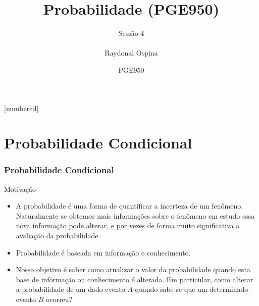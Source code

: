 


[numbered]



\hypersetup{colorlinks,linkcolor=,urlcolor=links}


\graphicspath{{./graphics/}} 			%

\newcommand{\cor}[1]{ \{{#1}\}}


\title[Probabilidade]{  Probabilidade (PGE950) }
\author[ Raydonal Ospina  
\ ]{
Sessão 4 \\
${}$ \\
Raydonal Ospina  }
\date[PGE950 - \today ]{{\tiny PGE950 }}






\begin{frame}
  \titlepage
\end{frame}


\section{Probabilidade Condicional}
\begin{frame}
\frametitle{Probabilidade Condicional}

\vspace{1cm}
\begin{block}{Motivação}
	\begin{itemize}
	
\item 	A probabilidade é uma forma de quantificar a incerteza de um fenômeno. Naturalmente se obtemos mais informações sobre o fenômeno em estudo essa nova informação pode alterar,  e por vezes de forma muito significativa a avaliação da probabilidade. 
	
\item Probabilidade é baseada em informação e conhecimento. 
	
\item Nosso objetivo é saber como atualizar o valor da probabilidade quando esta base de informação ou conhecimento é alterada. Em particular, como alterar a probabilidade de um dado evento $A$ quando sabe-se que um determinado evento $B$
	ocorreu?
	\end{itemize}
\end{block}
\end{frame}

